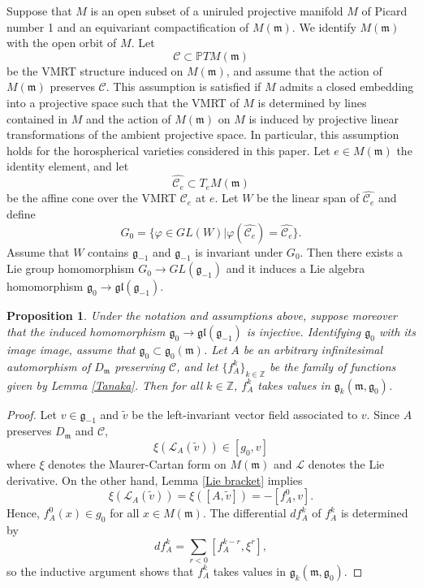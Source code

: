 \documentclass{amsart}
\newtheorem{proposition}[theorem]{Proposition}
\theoremstyle{definition}
\theoremstyle{remark}
\newcommand{\Z}{\mathbb{Z}}
\newcommand{\g}{\mathfrak{g}}
\newcommand{\m}{\mathfrak{m}}
\begin{document}
Suppose that $M$ is an open subset of a uniruled projective manifold $M$ of Picard number 1 and an equivariant compactification of $M(\m)$. We identify $M(\m)$ with the open orbit of $M$. Let 
\[\mathscr{C} \subset \mathbb{P}TM(\m)\]
be the VMRT structure induced on $M(\m)$, and assume that the action of $M(\m)$ preserves $\mathscr{C}$. This assumption is satisfied if $M$ admits a closed embedding into a projective space such that the VMRT of $M$ is determined by lines contained in $M$ and the action of $M(\m)$ on $M$ is induced by projective linear transformations of the ambient projective space. In particular, this assumption holds for the horospherical varieties considered in this paper. Let $e \in M(\m)$ the identity element, and let 
\[\widehat{\mathscr{C}_e} \subset T_eM(\m)\]
be the affine cone over the VMRT $\mathscr{C}_e$ at $e$. Let $W$ be the linear span of $\widehat{\mathscr{C}_e}$ and define 
\[G_0 = \{\varphi \in GL(W) | \varphi(\widehat{\mathscr{C}_e}) = \widehat{\mathscr{C}_e}\}.\]
Assume that $W$ contains $\g_{-1}$ and $\g_{-1}$ is invariant under $G_0$. Then there exists a Lie group homomorphism $G_0 \to GL(\g_{-1})$ and it induces a Lie algebra homomorphism $\g_0 \to \mathfrak{gl}(\g_{-1})$.

\begin{proposition}
\label{descending}
Under the notation and assumptions above, suppose moreover that the induced homomorphism $\g_0 \to \mathfrak{gl}(\g_{-1})$ is injective. Identifying $\g_0$ with its image image, assume that $\g_0 \subset \g_0(\m)$. Let $A$ be an arbitrary infinitesimal automorphism of $D_\m$ preserving $\mathscr{C}$, and let $\{f_A^k\}_{k \in \Z}$ be the family of functions given by Lemma \ref{Tanaka}. Then for all $k \in \Z$, $f_A^k$ takes values in $\g_k(\m, \g_0)$.
\end{proposition}

\begin{proof}
Let $v \in \g_{-1}$ and $\tilde{v}$ be the left-invariant vector field associated to $v$. Since $A$ preserves $D_\m$ and $\mathscr{C}$, 
\[\xi(\mathcal{L}_A(\tilde{v})) \in [g_0, v] \]
where $\xi$ denotes the Maurer-Cartan form on $M(\m)$ and $\mathcal{L}$ denotes the Lie derivative. On the other hand, Lemma \ref{Lie bracket} implies
\[\xi(\mathcal{L}_A(\tilde{v})) = \xi([A, \tilde{v}]) = -[f_A^0, v].\]
Hence, $f_A^0(x) \in g_0$ for all $x \in M(\m)$. The differential $df_A^k$ of $f_A^k$ is determined by 
\[df_A^k = \sum_{r < 0} [f_A^{k-r}, \xi^r],\] 
so the inductive argument shows that $f_A^k$ takes values in $\g_k(\m, \g_0)$.
\end{proof}
\end{document}
